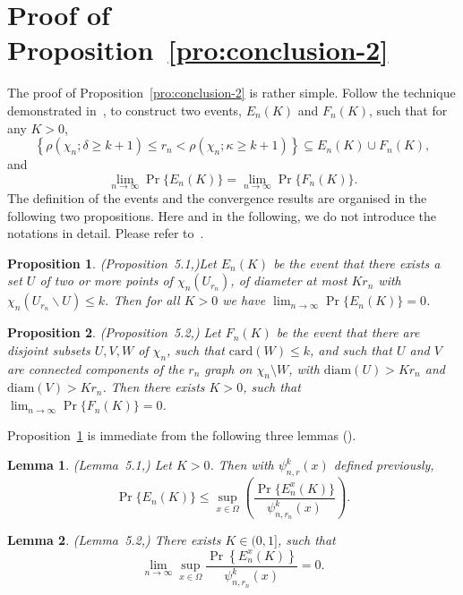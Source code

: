 \documentclass[preprint,12pt]{elsarticle}
\newtheorem{proposition}{Proposition}
\newtheorem{lemma}{Lemma}
\begin{document}
\section{Proof of Proposition~\ref{pro:conclusion-2}}


The proof of Proposition~\ref{pro:conclusion-2} is rather simple. Follow the technique demonstrated in~\cite{Penrose-k-connectivity,Ding-RGG2018, Ding-RGG2025, Ding2022-3DRadii}, to construct two events, $E_n(K)$ and $F_n(K)$,  such that for any $K>0$,
$$
     \left\{\rho(\chi_n;\delta\geq k+1)\leq r_n<\rho(\chi_n;\kappa\geq
k+1)\right\}\subseteq E_n(K)\cup F_n(K),
$$
and
$$
\lim_{n\rightarrow \infty}\Pr\{E_n(K)\}=\lim_{n\rightarrow \infty}\Pr\{F_n(K)\}.
$$
The definition of the events and the convergence results are organised in
the following two propositions.
Here and in the following, we do not introduce the notations in detail. Please refer to~\cite{Penrose-k-connectivity}.


\begin{proposition}(Proposition~5.1,\cite{Penrose-k-connectivity})\label{proposition-appendix-1}
Let $E_n(K)$ be the event that there exists a set $U$ of two or more
points of $\chi_n(U_{r_n})$, of diameter at most $Kr_n$ with
$\chi_n(U_{r_n}\backslash U)\leq k$. Then for all $K>0$ we have
$\lim_{n\rightarrow \infty}\Pr\{E_n(K)\}=0$.
\end{proposition}

\begin{proposition}\label{proposition-appendix-2}(Proposition~5.2,\cite{Penrose-k-connectivity})
Let $F_n(K)$ be the event that there are disjoint subsets $U,V,W$ of
$\chi_n$, such that $\mbox{card}(W)\leq k$, and such that $U$ and
$V$ are connected components of the $r_n$ graph on $\chi_n\setminus
W$, with $\mbox{diam}(U)>Kr_n$ and $\mbox{diam}(V)>Kr_n$. Then there
exists $K>0$, such that $\lim_{n\rightarrow \infty}\Pr\{F_n(K)\}=0$.
\end{proposition}

Proposition~\ref{proposition-appendix-1} is immediate from the following three lemmas (\cite{Penrose-k-connectivity}).
\begin{lemma}(Lemma~5.1,\cite{Penrose-k-connectivity})
     Let $K>0$. Then with $\psi^{k}_{n,r}(x)$ defined previously,
     $$
          \Pr\{E_n(K)\}\leq \sup_{x\in\Omega} \left(
          \frac{\Pr\{E_n^x(K)\}}{\psi^{k}_{n,r_n}(x)}
          \right).
     $$
\end{lemma}

\begin{lemma}\label{lemma5}(Lemma~5.2,\cite{Penrose-k-connectivity}) There exists $K\in (0,1]$, such that
   $$
        \lim_{n\rightarrow\infty}\mathop{\sup}_{x\in \Omega}
        \frac{\Pr\left\{E_n^x(K)\right\}}{\psi_{n,r_n}^k(x)}=0.
   $$
\end{lemma}
\end{document}
